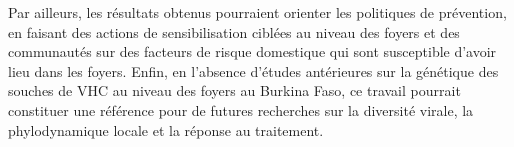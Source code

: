 \documentclass[a4paper,12pt]{article}
\begin{document}
Par ailleurs, les résultats obtenus pourraient orienter les politiques de prévention, en faisant des actions de
sensibilisation ciblées au niveau des foyers et des communautés sur des facteurs de risque domestique qui sont susceptible d'avoir lieu dans les foyers. Enfin, en l’absence d’études antérieures sur la génétique des souches de VHC au niveau des foyers au Burkina Faso, ce travail pourrait constituer une référence pour de futures recherches sur la diversité virale, la phylodynamique locale et la réponse au traitement.


\newpage 

\setcounter{page}{4}

\printbibliography
\end{document}
